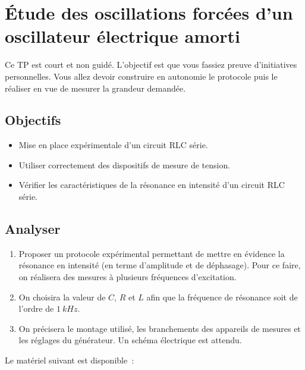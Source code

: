 \documentclass[a4paper, 11pt, final, garamond]{book}
\begin{document}
\setcounter{chapter}{11}

\chapter{\'Etude des oscillations forc\'ees d'un oscillateur \'electrique amorti}

\begin{bror}{}
    Ce TP est court et non guidé. L'objectif est que vous fassiez preuve
    d'initiatives personnelles. Vous allez devoir construire en autonomie le
    protocole puis le réaliser en vue de mesurer la grandeur demandée.
\end{bror}

\section{Objectifs}

\begin{itemize}
    \item Mise en place expérimentale d'un circuit RLC série. 
    \item Utiliser correctement des dispositifs de mesure de tension. 
    \item Vérifier les caractéristiques de la résonance en intensité d'un
        circuit RLC série. 
\end{itemize}

\section{Analyser}

\begin{enumerate}[label=\sqenumi]
    \item Proposer un protocole expérimental permettant de mettre en évidence la
        résonance en intensité (en terme d'amplitude et de déphasage). Pour ce
        faire, on réalisera des mesures à plusieurs fréquences d'excitation. 
    \item On choisira la valeur de $C$, $R$ et $L$ afin que la fréquence de
        résonance soit de l'ordre de $\SI{1}{kHz}$.
    \item On précisera le montage utilisé, les branchements des appareils de
        mesures et les réglages du générateur. Un schéma électrique est attendu. 
\end{enumerate}

Le matériel suivant est disponible~: 
\medskip
\end{document}
